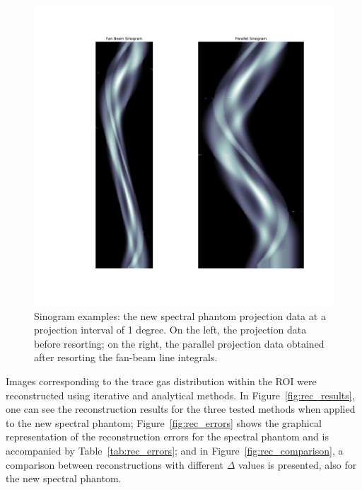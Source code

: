 \begin{figure}[htpb]
    \centering
    \includegraphics[clip, trim=7cm 4cm 3.2cm 3.5cm,
    width=.6\textwidth]{img/pdf/fanbeam_comparison.pdf}
    \caption{Sinogram examples: the new spectral phantom projection data
    at a projection interval of 1 degree. On the left, the projection
    data before resorting; on the right, the parallel projection data
    obtained after resorting the fan-beam line integrals.}
    \label{fig:sinograms}
\end{figure}

Images corresponding to the trace gas distribution within the ROI were
reconstructed using iterative and analytical methods. In
Figure~\ref{fig:rec_results}, one can see the reconstruction results for
the three tested methods when applied to the new spectral phantom;
Figure~\ref{fig:rec_errors} shows the graphical representation of the
reconstruction errors for the spectral phantom and is accompanied by
Table~\ref{tab:rec_errors}; and in Figure~\ref{fig:rec_comparison}, a
comparison between reconstructions with different $\Delta$ values is
presented, also for the new spectral phantom. 

